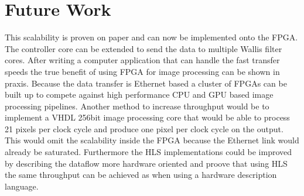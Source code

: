 \section{Future Work}
This scalability is proven on paper and can now be implemented onto the FPGA.
The controller core can be extended to send the data to multiple Wallis filter
cores. After writing a computer application that can handle the fast transfer
speeds the true benefit of using FPGA for image processing can be shown in
praxis. Because the data transfer is Ethernet based a cluster of FPGAs can be
built up to compete against high performance CPU and GPU based image processing
pipelines. Another method to increase throughput would be to implement a VHDL
256bit image processing core that would be able to process 21 pixels per clock
cycle and produce one pixel per clock cycle on the output. This would omit the
scalability inside the FPGA because the Ethernet link would already be
saturated. Furthermore the HLS implementations could be improved by describing
the dataflow more hardware oriented and proove that using HLS the same
throughput can be achieved as when using a hardware description language.

